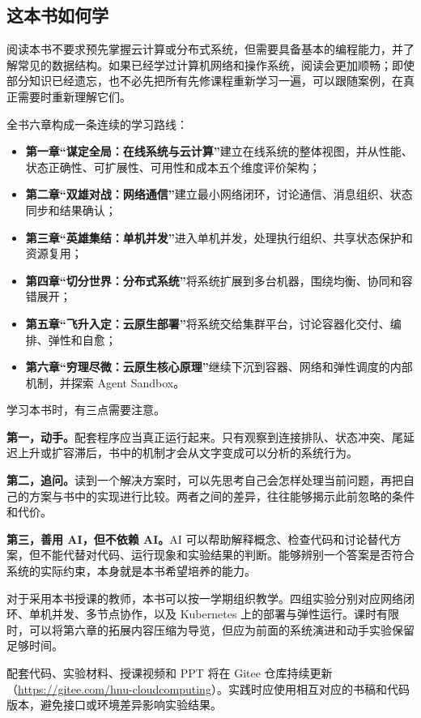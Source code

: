 \subsection*{这本书如何学}

阅读本书不要求预先掌握云计算或分布式系统，但需要具备基本的编程能力，并了解常见的数据结构。如果已经学过计算机网络和操作系统，阅读会更加顺畅；即使部分知识已经遗忘，也不必先把所有先修课程重新学习一遍，可以跟随案例，在真正需要时重新理解它们。

全书六章构成一条连续的学习路线：

\begin{itemize}
    \item \textbf{第一章“谋定全局：在线系统与云计算”}建立在线系统的整体视图，并从性能、状态正确性、可扩展性、可用性和成本五个维度评价架构；
    \item \textbf{第二章“双雄对战：网络通信”}建立最小网络闭环，讨论通信、消息组织、状态同步和结果确认；
    \item \textbf{第三章“英雄集结：单机并发”}进入单机并发，处理执行组织、共享状态保护和资源复用；
    \item \textbf{第四章“切分世界：分布式系统”}将系统扩展到多台机器，围绕均衡、协同和容错展开；
    \item \textbf{第五章“飞升入定：云原生部署”}将系统交给集群平台，讨论容器化交付、编排、弹性和自愈；
    \item \textbf{第六章“穷理尽微：云原生核心原理”}继续下沉到容器、网络和弹性调度的内部机制，并探索 Agent Sandbox。
\end{itemize}

学习本书时，有三点需要注意。

\textbf{第一，动手。}配套程序应当真正运行起来。只有观察到连接排队、状态冲突、尾延迟上升或扩容滞后，书中的机制才会从文字变成可以分析的系统行为。

\textbf{第二，追问。}读到一个解决方案时，可以先思考自己会怎样处理当前问题，再把自己的方案与书中的实现进行比较。两者之间的差异，往往能够揭示此前忽略的条件和代价。

\textbf{第三，善用 AI，但不依赖 AI。}AI 可以帮助解释概念、检查代码和讨论替代方案，但不能代替对代码、运行现象和实验结果的判断。能够辨别一个答案是否符合系统的实际约束，本身就是本书希望培养的能力。

对于采用本书授课的教师，本书可以按一学期组织教学。四组实验分别对应网络闭环、单机并发、多节点协作，以及 Kubernetes 上的部署与弹性运行。课时有限时，可以将第六章的拓展内容压缩为导览，但应为前面的系统演进和动手实验保留足够时间。

配套代码、实验材料、授课视频和 PPT 将在 Gitee 仓库持续更新（\url{https://gitee.com/hnu-cloudcomputing}）。实践时应使用相互对应的书稿和代码版本，避免接口或环境差异影响实验结果。

